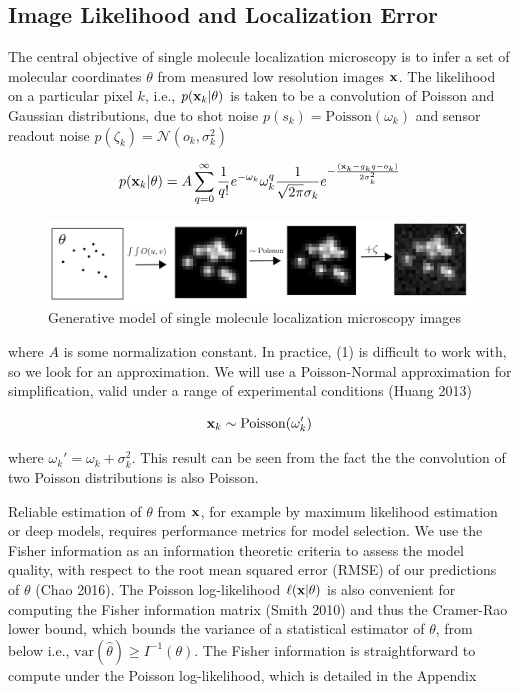 \documentclass{article}
\begin{document}
\subsection{Image Likelihood and Localization Error}

The central objective of single molecule localization microscopy is to infer a set of molecular coordinates $\theta$ from measured low resolution images $\bold{x}$. The likelihood on a particular pixel $k$, i.e., $p(\bold{x}_k|\theta)$ is taken to be a convolution of Poisson and Gaussian distributions, due to shot noise $p(s_{k}) = \mathrm{Poisson}(\omega_{k})$ and sensor readout noise $p(\zeta_{k}) = \mathcal{N}(o_{k},\sigma_{k}^{2})$ 

\begin{equation}
p(\bold{x}_{k}|\theta) = A\sum_{q=0}^{\infty} \frac{1}{q!}e^{-\omega_{k}}\omega_{k}^{q}\frac{1}{\sqrt{2\pi}\sigma_{k}}e^{-\frac{(\bold{x}_{k}-g_{k}q-o_{k})}{2\sigma_{k}^{2}}}
\end{equation}


\begin{figure}
\includegraphics[scale=0.65]{Generation-Figure.png}
\caption{Generative model of single molecule localization microscopy images}
\end{figure}


where $A$ is some normalization constant. In practice, (1) is difficult to work with, so we look for an approximation. We will use a Poisson-Normal approximation for simplification, valid under a range of experimental conditions (Huang 2013)

\begin{equation}
\bold{x}_{k} \sim \mathrm{Poisson}(\omega_{k}')
\end{equation}

where $\omega_{k}' = \omega_{k} + \sigma_{k}^{2}$. This result can be seen from the fact the the convolution of two Poisson distributions is also Poisson. 

Reliable estimation of $\theta$ from $\bold{x}$, for example by maximum likelihood estimation or deep models, requires performance metrics for model selection. We use the Fisher information as an information theoretic criteria to assess the model quality, with respect to the root mean squared error (RMSE) of our predictions of $\theta$ (Chao 2016). The Poisson log-likelihood $\ell(\bold{x}|\theta)$ is also convenient for computing the Fisher information matrix (Smith 2010) and thus the Cramer-Rao lower bound, which bounds the variance of a statistical estimator of $\theta$, from below i.e., $\mathrm{var}(\hat{\theta}) \geq I^{-1}(\theta)$. The Fisher information is straightforward to compute under the Poisson log-likelihood, which is detailed in the Appendix
\end{document}

